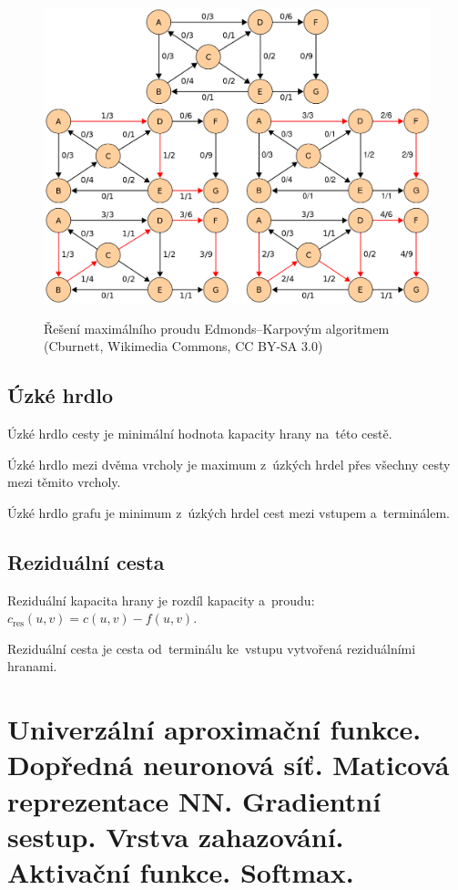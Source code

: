 \begin{figure}[ht]
\centering
\includegraphics[height=25em]{images/5_edmonds-karp}
\caption[Řešení maximálního proudu Edmonds--Karpovým algoritmem]{Řešení maximálního proudu Edmonds--Karpovým algoritmem\\{\small (Cburnett, Wikimedia Commons, CC BY-SA 3.0)}}
\end{figure}
\FloatBarrier

\subsection{Úzké hrdlo}

Úzké hrdlo cesty je minimální hodnota kapacity hrany na~této cestě.

Úzké hrdlo mezi dvěma vrcholy je maximum z~úzkých hrdel přes všechny cesty mezi těmito vrcholy.

Úzké hrdlo grafu je minimum z~úzkých hrdel cest mezi vstupem a~terminálem.

\subsection{Reziduální cesta}

Reziduální kapacita hrany je rozdíl kapacity a~proudu: $c_\mathrm{res}(u,v) = c(u,v) - f(u,v)$.

Reziduální cesta je cesta od~terminálu ke~vstupu vytvořená reziduálními hranami.

\clearpage
\section{Univerzální aproximační funkce. Dopředná neuronová síť. Maticová reprezentace NN. Gradientní sestup. Vrstva zahazování. Aktivační funkce. Softmax.}

